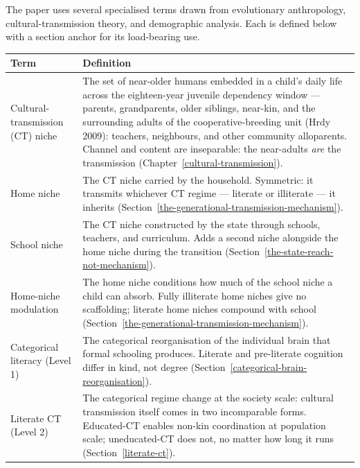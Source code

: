 \documentclass[12pt,letterpaper]{article}
\begin{document}
The paper uses several specialised terms drawn from evolutionary
anthropology, cultural-transmission theory, and demographic
analysis. Each is defined below with a section anchor for its
load-bearing use.

\renewcommand{\arraystretch}{1.15}
\begin{longtable}{@{}p{}p{}@{}}
\toprule
\textbf{Term} & \textbf{Definition} \\
\midrule
\endhead

Cultural-transmission (CT) niche &
The set of near-older humans embedded in a child's daily life across
the eighteen-year juvenile dependency window --- parents,
grandparents, older siblings, near-kin, and the surrounding adults
of the cooperative-breeding unit (Hrdy 2009): teachers, neighbours,
and other community alloparents. Channel and content are
inseparable: the near-adults \emph{are} the transmission
(Chapter~\ref{cultural-transmission}). \\

Home niche &
The CT niche carried by the household. Symmetric: it transmits
whichever CT regime --- literate or illiterate --- it inherits
(Section~\ref{the-generational-transmission-mechanism}). \\

School niche &
The CT niche constructed by the state through schools, teachers, and
curriculum. Adds a second niche alongside the home niche during the
transition (Section~\ref{the-state-reach-not-mechanism}). \\

Home-niche modulation &
The home niche conditions how much of the school niche a child can
absorb. Fully illiterate home niches give no scaffolding; literate
home niches compound with school
(Section~\ref{the-generational-transmission-mechanism}). \\

Categorical literacy (Level 1) &
The categorical reorganisation of the individual brain that formal
schooling produces. Literate and pre-literate cognition differ in
kind, not degree
(Section~\ref{categorical-brain-reorganisation}). \\

Literate CT (Level 2) &
The categorical regime change at the society scale: cultural
transmission itself comes in two incomparable forms. Educated-CT
enables non-kin coordination at population scale; uneducated-CT
does not, no matter how long it runs
(Section~\ref{literate-ct}). \\


\end{longtable}
\end{document}

